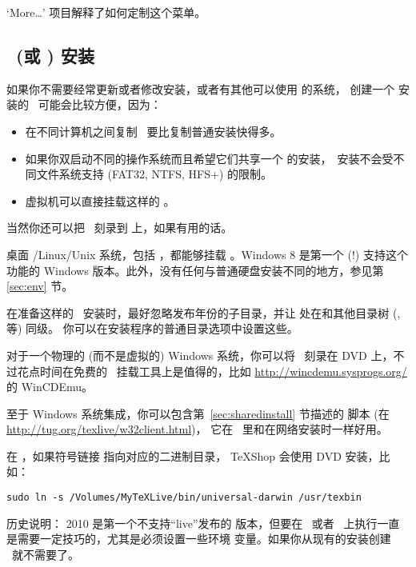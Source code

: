 \documentclass{article}
\begin{document}
\medskip
{}
\smallskip

\noindent `More\ldots' 项目解释了如何定制这个菜单。

\subsection{\ISO\ (或 \DVD) 安装}
\label{sec:isoinstall}

如果你不需要经常更新或者修改安装，或者有其他可以使用 \TL{} 的系统，
创建一个 \TL{} 安装的 \ISO\ 可能会比较方便，因为：

\begin{itemize}
\item 在不同计算机之间复制 \ISO\ 要比复制普通安装快得多。
\item 如果你双启动不同的操作系统而且希望它们共享一个
  \TL{} 的安装，\ISO\ 安装不会受不同文件系统支持
  (FAT32, NTFS, HFS+) 的限制。
\item 虚拟机可以直接挂载这样的 \ISO{}。
\end{itemize}

当然你还可以把 \ISO\ 刻录到 \DVD{} 上，如果有用的话。

桌面 \GNU/Linux/Unix 系统，包括 \MacOSX{}，都能够挂载 \ISO{}。Windows 8 是第一个
(!) 支持这个功能的 Windows 版本。此外，没有任何与普通硬盘安装不同的地方，参见第
\ref{sec:env} 节。

在准备这样的 \ISO\ 安装时，最好忽略发布年份的子目录，并让 
处在和其他目录树 (,  等) 同级。
你可以在安装程序的普通目录选项中设置这些。

对于一个物理的 (而不是虚拟的) Windows 系统，你可以将 \ISO\ 刻录在
DVD 上，不过花点时间在免费的 \ISO\ 挂载工具上是值得的，比如
\url{http://wincdemu.sysprogs.org/} 的 WinCDEmu。

至于 Windows 系统集成，你可以包含第~\ref{sec:sharedinstall} 节描述的
 脚本 (在 \url{http://tug.org/texlive/w32client.html})，
它在 \ISO\ 里和在网络安装时一样好用。

在 \MacOSX{}，如果符号链接  指向对应的二进制目录，
TeXShop 会使用 DVD 安装，比如：
\begin{verbatim}
sudo ln -s /Volumes/MyTeXLive/bin/universal-darwin /usr/texbin
\end{verbatim}

历史说明：\TL{} 2010 是第一个不支持“live”发布的 \TL{} 版本，但要在
\DVD\ 或者 \ISO\ 上执行一直是需要一定技巧的，尤其是必须设置一些环境
变量。如果你从现有的安装创建 \ISO\ 就不需要了。
\end{document}
